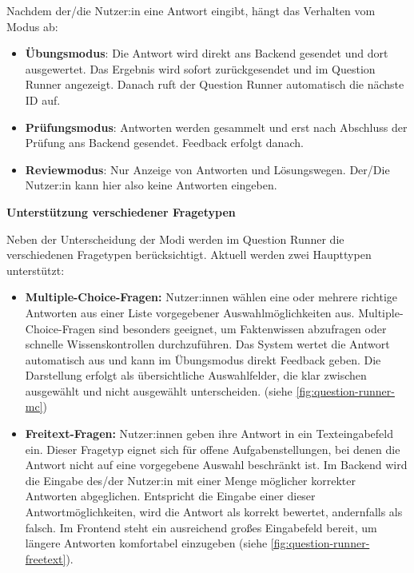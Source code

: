 Nachdem der/die Nutzer:in eine Antwort eingibt, hängt das Verhalten vom Modus ab:

\begin{itemize}
    \item \textbf{Übungsmodus}: 
        Die Antwort wird direkt ans Backend gesendet und dort ausgewertet. Das Ergebnis wird sofort zurückgesendet und
        im Question Runner angezeigt. Danach ruft der Question Runner automatisch die nächste ID auf.
    \item \textbf{Prüfungsmodus}: 
        Antworten werden gesammelt und erst nach Abschluss der Prüfung ans Backend gesendet. Feedback erfolgt danach.
    \item \textbf{Reviewmodus}: 
        Nur Anzeige von Antworten und Lösungswegen. Der/Die Nutzer:in kann hier also keine Antworten eingeben.
\end{itemize}

\vspace{1cm}
\textbf{Unterstützung verschiedener Fragetypen}

Neben der Unterscheidung der Modi werden im Question Runner die verschiedenen Fragetypen berücksichtigt. Aktuell 
werden zwei Haupttypen unterstützt:

\begin{itemize}
    \item \textbf{Multiple-Choice-Fragen:} 
        Nutzer:innen wählen eine oder mehrere richtige Antworten aus einer Liste vorgegebener Auswahlmöglichkeiten aus. 
        Multiple-Choice-Fragen sind besonders geeignet, um Faktenwissen abzufragen oder schnelle Wissenskontrollen durchzuführen. 
        Das System wertet die Antwort automatisch aus und kann im Übungsmodus direkt Feedback geben. 
        Die Darstellung erfolgt als übersichtliche Auswahlfelder, die klar zwischen ausgewählt und nicht ausgewählt unterscheiden.
        (siehe \autoref{fig:question-runner-mc})
        
    \item \textbf{Freitext-Fragen:} 
        Nutzer:innen geben ihre Antwort in ein Texteingabefeld ein. 
        Dieser Fragetyp eignet sich für offene Aufgabenstellungen, bei denen die Antwort nicht auf eine vorgegebene Auswahl 
        beschränkt ist. 
        Im Backend wird die Eingabe des/der Nutzer:in mit einer Menge möglicher korrekter Antworten abgeglichen. 
        Entspricht die Eingabe einer dieser Antwortmöglichkeiten, wird die Antwort als korrekt bewertet, andernfalls als falsch. 
        Im Frontend steht ein ausreichend großes Eingabefeld bereit, um längere Antworten komfortabel einzugeben 
        (siehe \autoref{fig:question-runner-freetext}).
\end{itemize}

